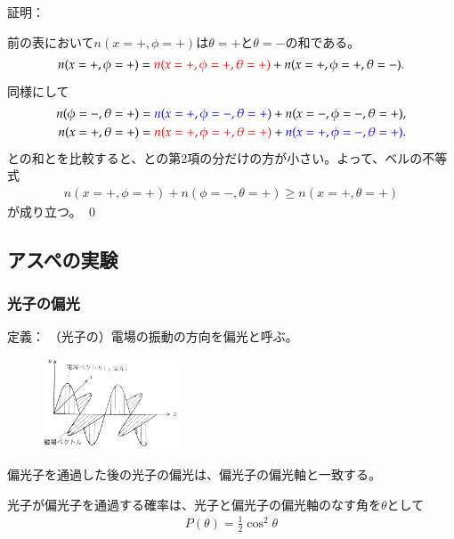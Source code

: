 \documentclass[10pt,b5paper,papersize,dvipdfmx]{jsbook}
\begin{document}
\noindent 証明：\par
前の表において$n(x=+,\phi=+)$は$\theta = +$と$\theta = -$の和である。
\begin{align}
  \label{eq:bell-1}
  n(x=+,\phi=+) = \textcolor{red}{n(x=+,\phi=+, \theta=+)} + n(x=+,\phi=+, \theta=-).
\end{align}
同様にして
\begin{align}
  \label{eq:bell-2}
  n(\phi=-,\theta=+) &= \textcolor{blue}{n(x=+, \phi=-,\theta=+)} + n(x=-, \phi=-,\theta=+)
  , \\
  \label{eq:bell-3}
  n(x=+,\theta=+) &= \textcolor{red}{n(x=+, \phi=+, \theta=+)} + \textcolor{blue}{n(x=+, \phi=-, \theta=+)}.
\end{align}
との和とを比較すると、との第2項の分だけの方が小さい。よって、ベルの不等式
\begin{align*}
  n(x=+,\phi=+) + n(\phi=-,\theta=+) \ge n(x=+,\theta=+)
\end{align*}
が成り立つ。
\qed

%
\subsection{アスペの実験} %

%
\subsubsection{光子の偏光} %

定義：
（光子の）電場の振動の方向を偏光と呼ぶ。

\begin{figure}[ht]
  \centering
  \includegraphics[width=40mm]{nkym/fig/henkou.jpeg}
\end{figure}

偏光子を通過した後の光子の偏光は、偏光子の偏光軸と一致する。

光子が偏光子を通過する確率は、光子と偏光子の偏光軸のなす角を$\theta$として
\begin{align*}
  P(\theta) = \frac12 \cos^2\theta
\end{align*}
\end{document}
